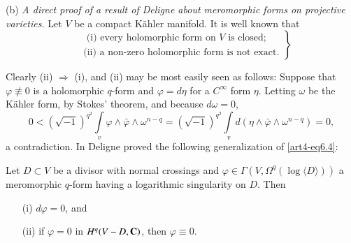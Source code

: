 (b) \textit{A direct proof of a result of Deligne about meromorphic forms on projective varieties.} Let $V$ be a compact K\"ahler manifold. It is well known that 
\begin{equation}
\left.
\begin{aligned}
 & \text{~(i) every holomorphic form on $V$ is closed;}\\
 & \text{(ii) a non-zero holomorphic form is not exact.} 
\end{aligned}
\right\}\label{art4-eq6.4}
\end{equation}

Clearly (ii) $\Rightarrow$ (i), and (ii) may be most easily seen as follows: Suppose that $\varphi \not\equiv 0$ is a holomorphic $q$-form and $\varphi = d \eta$ for a $C^\infty$ form $\eta$. Letting $\omega$ be the K\"ahler form, by Stokes' theorem, and because $d\omega = 0$,
$$
0 < (\sqrt{-1})^{q^2} \int\limits_v \varphi \wedge \bar{\varphi} \wedge \omega^{n-q} = (\sqrt{-1})^{q^2} \int\limits_v d (\eta \wedge \bar{\varphi} \wedge \omega^{n-q}) = 0,
$$
a contradiction. In \cite{art4-key13} Deligne proved the following generalization of \eqref{art4-eq6.4}:

\begin{proposition}\label{art4-eq6.5}
Let $D \subset V$ be a divisor with normal crossings and $\varphi \in \Gamma (V, \Omega^q (\log \langle D \rangle))$ a meromorphic $q$-form having a logarithmic singularity on $D$. Then
\begin{itemize}
\item[(i)] $d\varphi = 0$, and 

\item[(ii)] if $\varphi =0$ in $H^q (V - D, \mathbf{C})$, then $\varphi \equiv 0$.
\end{itemize}
\end{proposition}

